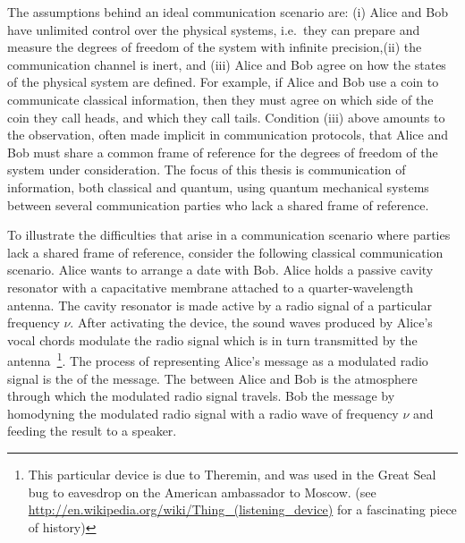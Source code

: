 The assumptions behind an ideal communication scenario are: (i) Alice and Bob have unlimited control over the physical systems, i.e.~they can prepare and measure the degrees of freedom of the system with infinite precision,(ii) the communication channel is inert, and (iii) Alice and Bob agree on how the states of the physical system are defined. For example, if Alice and Bob use a coin to communicate classical information, then they must agree on which side of the coin they call heads, and which they call tails. Condition (iii) above amounts to the observation, often made implicit in communication protocols, that Alice and Bob must share a common frame of reference for the degrees of freedom of the system under consideration. The focus of this thesis is communication of information, both classical and quantum, using quantum mechanical systems between several communication parties who lack a shared frame of reference.  

To illustrate the difficulties that arise in a communication scenario where parties lack a shared frame of reference, consider the following classical communication scenario.  Alice wants to arrange a date with Bob.  Alice holds a passive cavity resonator with a capacitative membrane attached to a quarter-wavelength antenna.  The cavity resonator is made active by a radio signal of a particular frequency $\nu$.  After activating the device, the sound waves produced by Alice's vocal chords modulate the radio signal which is in turn transmitted by the antenna~\footnote{This particular device is due to Theremin, and was used in the Great Seal bug to eavesdrop on the American ambassador to Moscow. (see \url{http://en.wikipedia.org/wiki/Thing_(listening_device)} for a fascinating piece of history)}. The process of representing Alice's message as a modulated radio signal is the  of the message.  The  between Alice and Bob is the atmosphere through which the modulated radio signal travels.  Bob  the message by homodyning the modulated radio signal with a radio wave of frequency $\nu$ and feeding the result to a speaker. 

